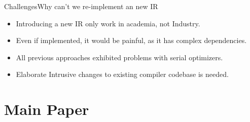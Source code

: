 \documentclass{beamer}
\begin{document}
\begin{frame}{Challenges}{Why can't we re-implement an new IR}

\begin{itemize}
    \item Introducing a new IR only work in academia, not Industry.
    \item Even if implemented, it would be painful, as it has complex dependencies.
    \item All previous approaches exhibited problems with serial optimizers.
    \item Elaborate Intrusive changes to existing compiler codebase is needed.
\end{itemize}
  
\end{frame}

\section{Main Paper}
\end{document}
